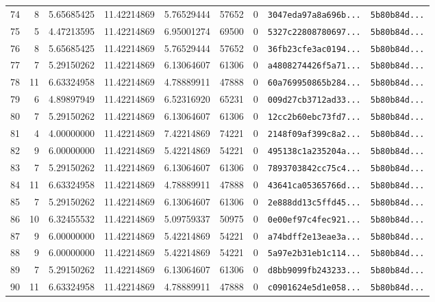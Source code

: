 \documentclass[10pt]{article}
\begin{document}
\begin{longtable}{rrrrrrrll}
  74 & 8 & 5.65685425 & 11.42214869 & 5.76529444 & 57652 & 0 & \texttt{3047eda97a8a696b...} & \texttt{5b80b84d...} \\
  75 & 5 & 4.47213595 & 11.42214869 & 6.95001274 & 69500 & 0 & \texttt{5327c22808780697...} & \texttt{5b80b84d...} \\
  76 & 8 & 5.65685425 & 11.42214869 & 5.76529444 & 57652 & 0 & \texttt{36fb23cfe3ac0194...} & \texttt{5b80b84d...} \\
  77 & 7 & 5.29150262 & 11.42214869 & 6.13064607 & 61306 & 0 & \texttt{a4808274426f5a71...} & \texttt{5b80b84d...} \\
  78 & 11 & 6.63324958 & 11.42214869 & 4.78889911 & 47888 & 0 & \texttt{60a769950865b284...} & \texttt{5b80b84d...} \\
  79 & 6 & 4.89897949 & 11.42214869 & 6.52316920 & 65231 & 0 & \texttt{009d27cb3712ad33...} & \texttt{5b80b84d...} \\
  80 & 7 & 5.29150262 & 11.42214869 & 6.13064607 & 61306 & 0 & \texttt{12cc2b60ebc73fd7...} & \texttt{5b80b84d...} \\
  81 & 4 & 4.00000000 & 11.42214869 & 7.42214869 & 74221 & 0 & \texttt{2148f09af399c8a2...} & \texttt{5b80b84d...} \\
  82 & 9 & 6.00000000 & 11.42214869 & 5.42214869 & 54221 & 0 & \texttt{495138c1a235204a...} & \texttt{5b80b84d...} \\
  83 & 7 & 5.29150262 & 11.42214869 & 6.13064607 & 61306 & 0 & \texttt{7893703842cc75c4...} & \texttt{5b80b84d...} \\
  84 & 11 & 6.63324958 & 11.42214869 & 4.78889911 & 47888 & 0 & \texttt{43641ca05365766d...} & \texttt{5b80b84d...} \\
  85 & 7 & 5.29150262 & 11.42214869 & 6.13064607 & 61306 & 0 & \texttt{2e888dd13c5ffd45...} & \texttt{5b80b84d...} \\
  86 & 10 & 6.32455532 & 11.42214869 & 5.09759337 & 50975 & 0 & \texttt{0e00ef97c4fec921...} & \texttt{5b80b84d...} \\
  87 & 9 & 6.00000000 & 11.42214869 & 5.42214869 & 54221 & 0 & \texttt{a74bdff2e13eae3a...} & \texttt{5b80b84d...} \\
  88 & 9 & 6.00000000 & 11.42214869 & 5.42214869 & 54221 & 0 & \texttt{5a97e2b31eb1c114...} & \texttt{5b80b84d...} \\
  89 & 7 & 5.29150262 & 11.42214869 & 6.13064607 & 61306 & 0 & \texttt{d8bb9099fb243233...} & \texttt{5b80b84d...} \\
  90 & 11 & 6.63324958 & 11.42214869 & 4.78889911 & 47888 & 0 & \texttt{c0901624e5d1e058...} & \texttt{5b80b84d...} \\

\end{longtable}
\end{document}
